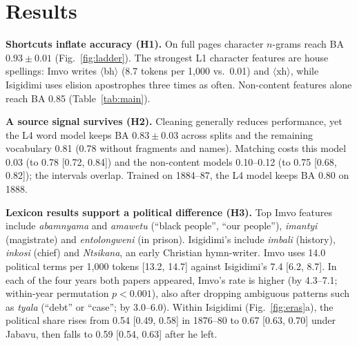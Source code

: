 \documentclass[10pt,letterpaper]{article}
\newcommand{\grapheme}[1]{$\langle$#1$\rangle$}
\begin{document}
\setlength{\belowcaptionskip}{-6pt}
\begin{table}[t]
\centering
\captionsetup{font=sf, width=0.98\linewidth, skip=4pt}
\caption{ Test results: macro-F1 with issue-bootstrap 95\% CI (seed 13), s.d.\ over 3 splits, BA, and BA$_m$ on the 134 matched pairs (CIs in Supp.). Majority class: macro-F1 $\approx$0.45.}
\footnotesize
\setlength{\tabcolsep}{2.2pt}

\label{tab:main}
\end{table}
\setlength{\belowcaptionskip}{0pt}

\section{Results}\label{Results}
\textbf{Shortcuts inflate accuracy (H1).} On full pages character $n$-grams reach BA $0.93\pm0.01$ (Fig.~\ref{fig:ladder}). The strongest L1 character features are house spellings: Imvo writes \grapheme{bh} (8.7 tokens per 1{,}000 vs.\ 0.01) and \grapheme{xh}, while Isigidimi uses elision apostrophes three times as often. Non-content features alone reach BA 0.85 (Table~\ref{tab:main}).

 \textbf{A source signal survives (H2).} Cleaning generally reduces performance, yet the L4 word model keeps BA $0.83\pm0.03$ across splits and the remaining vocabulary 0.81 (0.78 without fragments and names). Matching costs this model 0.03 (to 0.78 [0.72, 0.84]) and the non-content models 0.10--0.12 (to 0.75 [0.68, 0.82]); the intervals overlap. Trained on 1884--87, the L4 model keeps BA 0.80 on 1888.

 \textbf{Lexicon results support a political difference (H3).} Top Imvo features include \emph{abamnyama} and \emph{amawetu} (``black people'', ``our people''), \emph{imantyi} (magistrate) and \emph{entolongweni} (in prison). Isigidimi's include \emph{imbali} (history), \emph{inkosi} (chief) and \emph{Ntsikana}, an early Christian hymn-writer. Imvo uses 14.0 political terms per 1{,}000 tokens [13.2, 14.7] against Isigidimi's 7.4 [6.2, 8.7]. In each of the four years both papers appeared, Imvo's rate is higher (by 4.3--7.1; within-year permutation $p<0.001$), also after dropping ambiguous patterns such as \emph{tyala} (``debt'' or ``case''; by 3.0--6.0).  Within Isigidimi (Fig.~\ref{fig:eras}a), the political share rises from 0.54 [0.49, 0.58] in 1876--80 to 0.67 [0.63, 0.70] under Jabavu, then falls to 0.59 [0.54, 0.63] after he left.
\end{document}
